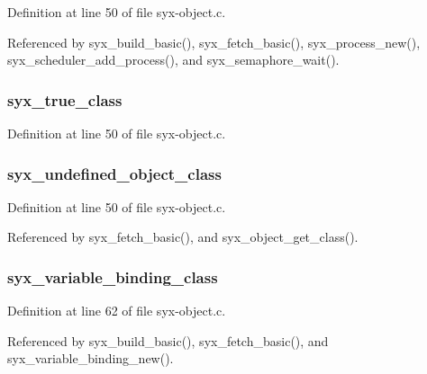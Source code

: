 Definition at line 50 of file syx-object.c.

Referenced by syx\_\-build\_\-basic(), syx\_\-fetch\_\-basic(), syx\_\-process\_\-new(), syx\_\-scheduler\_\-add\_\-process(), and syx\_\-semaphore\_\-wait().\hypertarget{syx-object_8c_d4717a5b0d7434075eafe75b61a25c1a}{
\subsubsection{ {\bf syx\_\-true\_\-class}}}
\label{syx-object_8c_d4717a5b0d7434075eafe75b61a25c1a}




Definition at line 50 of file syx-object.c.\hypertarget{syx-object_8c_fdf28614ea5338b2445fd47c330f2b83}{
\subsubsection{ {\bf syx\_\-undefined\_\-object\_\-class}}}
\label{syx-object_8c_fdf28614ea5338b2445fd47c330f2b83}




Definition at line 50 of file syx-object.c.

Referenced by syx\_\-fetch\_\-basic(), and syx\_\-object\_\-get\_\-class().\hypertarget{syx-object_8c_6e0e5c8e64c8634d625651aa9f73e690}{
\subsubsection{ {\bf syx\_\-variable\_\-binding\_\-class}}}
\label{syx-object_8c_6e0e5c8e64c8634d625651aa9f73e690}




Definition at line 62 of file syx-object.c.

Referenced by syx\_\-build\_\-basic(), syx\_\-fetch\_\-basic(), and syx\_\-variable\_\-binding\_\-new().